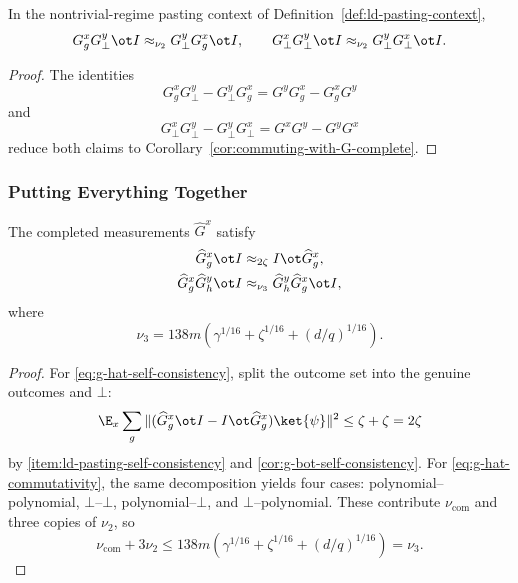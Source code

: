 \begin{corollary}\label{cor:commuting-with-G-incomplete}
	\leanok
	In the nontrivial-regime pasting context of Definition~\ref{def:ld-pasting-context},
	\[
		G_g^x G_\bot^y \ot I \approx_{\nu_2} G_\bot^y G_g^x \ot I,
		\qquad
		G_\bot^x G_\bot^y \ot I \approx_{\nu_2} G_\bot^y G_\bot^x \ot I.
	\]
\end{corollary}
\begin{proof}
	\leanok
	The identities
	\[
		G_g^x G_\bot^y - G_\bot^y G_g^x = G^y G_g^x - G_g^x G^y
	\]
	and
	\[
		G_\bot^x G_\bot^y - G_\bot^y G_\bot^x = G^x G^y - G^y G^x
	\]
	reduce both claims to Corollary~\ref{cor:commuting-with-G-complete}.
\end{proof}

\subsubsection{Putting Everything Together}

\begin{corollary}\label{cor:G-hat-facts}
	\leanok
	The completed measurements $\widehat G^x$ satisfy
	\begin{align}
		\widehat G_g^x \ot I                & \approx_{2\zeta} I \ot \widehat G_g^x, \label{eq:g-hat-self-consistency}           \\
		\widehat G_g^x \widehat G_h^y \ot I & \approx_{\nu_3} \widehat G_h^y \widehat G_g^x \ot I, \label{eq:g-hat-commutativity}
	\end{align}
	where
	\[
		\nu_3 = 138m\left(\gamma^{1/16}+\zeta^{1/16}+(d/q)^{1/16}\right).
	\]
\end{corollary}
\begin{proof}
	\leanok
	For \ref{eq:g-hat-self-consistency}, split the outcome set into the genuine outcomes and $\bot$:
	\[
		\E_x \sum_g \|(\widehat G_g^x \ot I - I \ot \widehat G_g^x)\ket{\psi}\|^2
		\le \zeta + \zeta = 2\zeta
	\]
	by \ref{item:ld-pasting-self-consistency} and \ref{cor:g-bot-self-consistency}. For \ref{eq:g-hat-commutativity}, the same decomposition yields four cases: polynomial--polynomial, $\bot$--$\bot$, polynomial--$\bot$, and $\bot$--polynomial. These contribute $\nu_{\mathrm{com}}$ and three copies of $\nu_2$, so
	\[
		\nu_{\mathrm{com}} + 3\nu_2
		\le
		138m\left(\gamma^{1/16}+\zeta^{1/16}+(d/q)^{1/16}\right)
		= \nu_3.
	\]
\end{proof}

